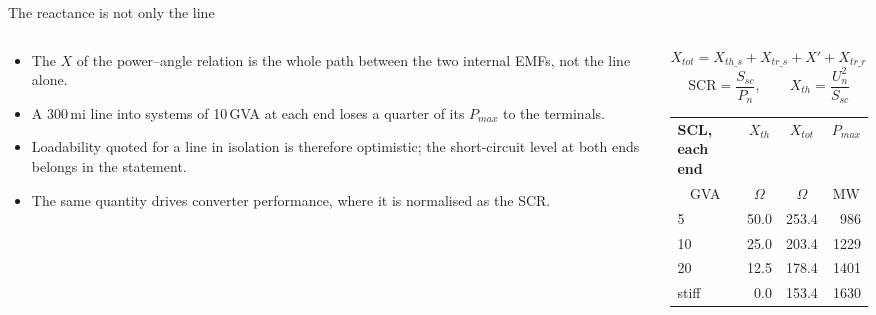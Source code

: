 \begin{frame}{The reactance is not only the line}
  \begin{columns}[T,onlytextwidth]
    \begin{column}{0.50\textwidth}
      {\small
      \begin{itemize}
        \setlength{\itemsep}{0.4em}
        \item The $X$ of the power--angle relation is the whole path
              between the two internal EMFs, not the line alone.
        \item A 300\,mi line into systems of 10\,GVA at each end loses a
              quarter of its $P_{max}$ to the terminals.
        \item Loadability quoted for a line in isolation is therefore
              optimistic; the short-circuit level at both ends belongs in
              the statement.
        \item The same quantity drives converter performance, where it is
              normalised as the SCR.
      \end{itemize}}
    \end{column}
    \begin{column}{0.47\textwidth}
      \setlength{\abovedisplayskip}{2pt}\setlength{\belowdisplayskip}{4pt}
      \[ X_{tot} = X_{th\_s} + X_{tr\_s} + X' + X_{tr\_r} + X_{th\_r} \]
      \[ \mathrm{SCR} = \frac{S_{sc}}{P_n},\qquad
         X_{th} = \frac{U_n^2}{S_{sc}} \]
      \renewcommand{\arraystretch}{1.15}
      {\footnotesize
      \begin{tabular}{@{}l r r r@{}}
        \textbf{SCL, each end} & \multicolumn{1}{c}{\textbf{$X_{th}$}}
                               & \multicolumn{1}{c}{\textbf{$X_{tot}$}}
                               & \multicolumn{1}{c}{\textbf{$P_{max}$}} \\
        \multicolumn{1}{c}{GVA} & \multicolumn{1}{c}{$\Omega$}
                               & \multicolumn{1}{c}{$\Omega$}
                               & \multicolumn{1}{c}{MW} \\
        \hline
        5        & 50.0 & 253.4 &  986 \\
        10       & 25.0 & 203.4 & 1229 \\
        20       & 12.5 & 178.4 & 1401 \\
        stiff    &  0.0 & 153.4 & 1630 \\
        \hline
      \end{tabular}}
    \end{column}
  \end{columns}
\end{frame}

